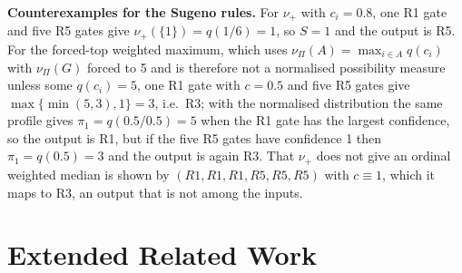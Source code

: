 \documentclass[11pt,a4paper]{article}%
\begin{document}
\textbf{Counterexamples for the Sugeno rules.} For $\nu_+$ with $c_i=0.8$, one R1 gate and five R5 gates give $\nu_+(\{1\})=q(1/6)=1$, so $S=1$ and the output is R5. For the forced-top weighted maximum, which uses $\nu_\Pi(A)=\max_{i\in A}q(c_i)$ with $\nu_\Pi(G)$ forced to 5 and is therefore not a normalised possibility measure unless some $q(c_i)=5$, one R1 gate with $c=0.5$ and five R5 gates give $\max\{\min(5,3),1\}=3$, i.e.\ R3; with the normalised distribution the same profile gives $\pi_1=q(0.5/0.5)=5$ when the R1 gate has the largest confidence, so the output is R1, but if the five R5 gates have confidence 1 then $\pi_1=q(0.5)=3$ and the output is again R3. That $\nu_+$ does not give an ordinal weighted median is shown by $(R1,R1,R1,R5,R5,R5)$ with $c\equiv1$, which it maps to R3, an output that is not among the inputs.

\section{Extended Related Work}\label{sup:related}
\end{document}
